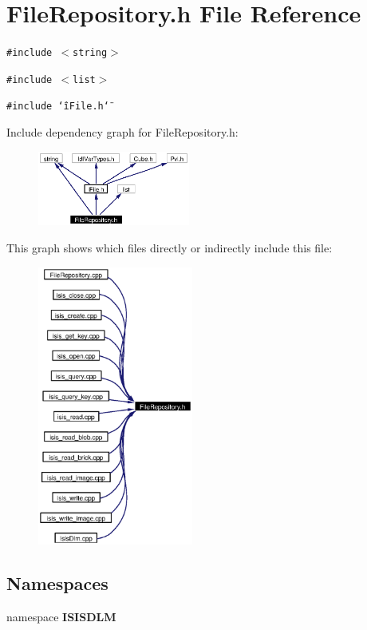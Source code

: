 \section{File\-Repository.h File Reference}
\label{FileRepository_8h}
{\tt \#include $<$string$>$}\par
{\tt \#include $<$list$>$}\par
{\tt \#include \char`\"{}i\-File.h\char`\"{}}\par


Include dependency graph for File\-Repository.h:\begin{figure}[H]
\begin{center}
\leavevmode
\includegraphics[width=142pt]{FileRepository_8h__incl}
\end{center}
\end{figure}


This graph shows which files directly or indirectly include this file:\begin{figure}[H]
\begin{center}
\leavevmode
\includegraphics[width=145pt]{FileRepository_8h__dep__incl}
\end{center}
\end{figure}
\subsection*{Namespaces}
\begin{CompactItemize}
\item 
namespace {\bf ISISDLM}
\end{CompactItemize}
